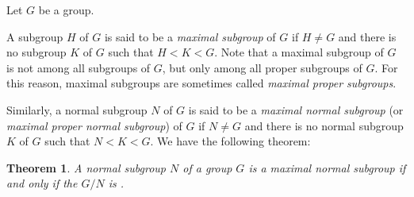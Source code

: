 \documentclass[12pt]{article}
\newtheorem*{thm*}{Theorem}
\begin{document}

Let $G$ be a group.

A subgroup $H$ of $G$
is said to be a \emph{maximal subgroup} of $G$
if $H\neq G$ and there is no subgroup $K$ of $G$
such that $H<K<G$.
Note that a maximal subgroup of $G$ is not  among all subgroups of $G$,
but only among all proper subgroups of $G$.
For this reason, maximal subgroups are sometimes called \emph{maximal proper subgroups}.

Similarly, a normal subgroup $N$ of $G$
is said to be a \emph{maximal normal subgroup} 
(or \emph{maximal proper normal subgroup}) of $G$
if $N\neq G$ and there is no normal subgroup $K$ of $G$
such that $N<K<G$.
We have the following theorem:

\begin{thm*}
A normal subgroup $N$ of a group $G$ is a maximal normal subgroup
if and only if the  $G/N$
is .
\end{thm*}
\end{document}
